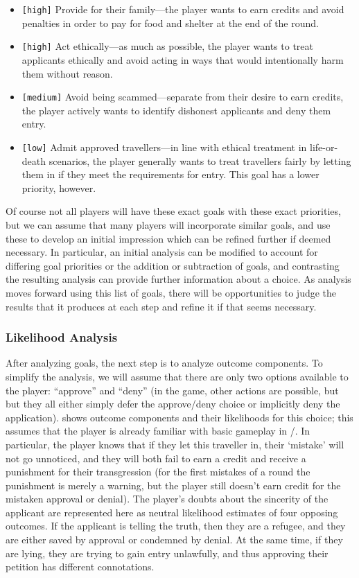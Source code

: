 \begin{itemize}
  \item \texttt{[high]} Provide for their family---the player wants to earn credits and avoid penalties in order to pay for food and shelter at the end of the round.
  \item \texttt{[high]} Act ethically---as much as possible, the player wants to treat applicants ethically and avoid acting in ways that would intentionally harm them without reason.
  \item \texttt{[medium]} Avoid being scammed---separate from their desire to earn credits, the player actively wants to identify dishonest applicants and deny them entry.
  \item \texttt{[low]} Admit approved travellers---in line with ethical treatment in life-or-death scenarios, the player generally wants to treat travellers fairly by letting them in if they meet the requirements for entry. This goal has a lower priority, however.
\end{itemize}

Of course not all players will have these exact goals with these exact priorities, but we can assume that many players will incorporate similar goals, and use these to develop an initial impression which can be refined further if deemed necessary.
%
In particular, an initial analysis can be modified to account for differing goal priorities or the addition or subtraction of goals, and contrasting the resulting analysis can provide further information about a choice.
%
As analysis moves forward using this list of goals, there will be opportunities to judge the results that it produces at each step and refine it if that seems necessary.

\subsubsection{Likelihood Analysis}

After analyzing goals, the next step is to analyze outcome components.
%
To simplify the analysis, we will assume that there are only two options available to the player: ``approve'' and ``deny'' (in the game, other actions are possible, but but they all either simply defer the approve/deny choice or implicitly deny the application).
%
 shows outcome components and their likelihoods for this choice; this assumes that the player is already familiar with basic gameplay in \papersplease/.
%
In particular, the player knows that if they let this traveller in, their `mistake' will not go unnoticed, and they will both fail to earn a credit and receive a punishment for their transgression (for the first mistakes of a round the punishment is merely a warning, but the player still doesn't earn credit for the mistaken approval or denial).
%
The player's doubts about the sincerity of the applicant are represented here as neutral likelihood estimates of four opposing outcomes.
%
If the applicant is telling the truth, then they are a refugee, and they are either saved by approval or condemned by denial.
%
At the same time, if they are lying, they are trying to gain entry unlawfully, and thus approving their petition has different connotations.


